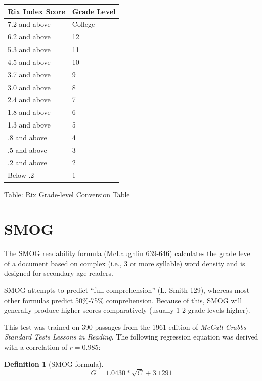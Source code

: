 \documentclass[
]{book}
\theoremstyle{definition}
\newtheorem{definition}{Definition}[chapter]
\theoremstyle{definition}
\theoremstyle{definition}
\theoremstyle{definition}
\theoremstyle{remark}
\begin{document}
\begin{minipage}{\textwidth}

\begin{longtable}[]{@{}ll@{}}
\toprule
Rix Index Score & Grade Level \\
\midrule
\endhead
7.2 and above & College \\
6.2 and above & 12 \\
5.3 and above & 11 \\
4.5 and above & 10 \\
3.7 and above & 9 \\
3.0 and above & 8 \\
2.4 and above & 7 \\
1.8 and above & 6 \\
1.3 and above & 5 \\
.8 and above & 4 \\
.5 and above & 3 \\
.2 and above & 2 \\
Below .2 & 1 \\
\bottomrule
\end{longtable}

\end{minipage}

Table: Rix Grade-level Conversion Table

\newpage

\hypertarget{smog-test}{%
\section{\texorpdfstring{SMOG}{SMOG}}\label{smog-test}}

The SMOG readability formula (McLaughlin 639-646) calculates the grade level of a document based on complex (i.e., 3 or more syllable) word density and is designed for secondary-age readers.

SMOG attempts to predict ``full comprehension'' (L. Smith 129), whereas most other formulas predict 50\%-75\% comprehension. Because of this, SMOG will generally produce higher scores comparatively (usually 1-2 grade levels higher).

This test was trained on 390 passages from the 1961 edition of \emph{McCall-Crabbs Standard Tests Lessons in Reading}. The following regression equation was derived with a correlation of \(r = 0.985\):

\begin{definition}[SMOG formula]
\protect\hypertarget{def:smog}{}{\label{def:smog} {} }\[
G = 1.0430*\sqrt{C} + 3.1291
\]
\end{definition}
\end{document}
